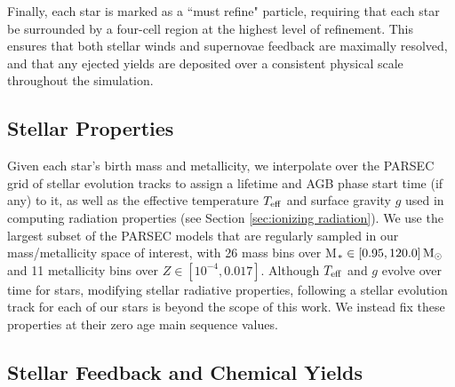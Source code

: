 \documentclass[twocolumn]{aastex61}
\begin{document}
Finally, each star is marked as a ``must refine" particle, requiring that each star be surrounded by a four-cell region at the highest level of refinement. This ensures that both stellar winds and supernovae feedback are maximally resolved, and that any ejected yields are deposited over a consistent physical scale throughout the simulation.

\subsection{Stellar Properties}
\label{sec:properties}
Given each star's birth mass and metallicity, we interpolate over the PARSEC grid of stellar evolution tracks \citep{Bressan2012} to assign a lifetime and AGB phase start time (if any) to it, as well as the effective temperature $T_{\rm eff}$ and surface gravity $g$ used in computing radiation properties (see Section \ref{sec:ionizing radiation}). We use the largest subset of the PARSEC models that are regularly sampled in our mass/metallicity space of interest, with 26 mass bins over M$_{*} \in \left[0.95, 120.0 \right] {\rm M_{\odot}}$ and 11 metallicity bins over $Z \in \left[10^{-4}, 0.017 \right]$. Although $T_{\rm eff}$ and $g$ evolve over time for stars, modifying stellar radiative properties, following a stellar evolution track for each of our stars is beyond the scope of this work. We instead fix these properties at their zero age main sequence values.

\subsection{Stellar Feedback and Chemical Yields}
\end{document}
